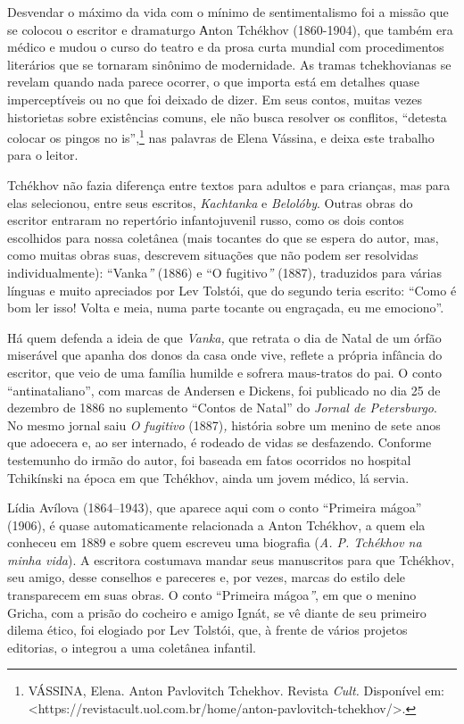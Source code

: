 Desvendar o máximo da vida com o mínimo de sentimentalismo foi a missão
que se colocou o escritor e dramaturgo Аnton Tchékhov (1860-1904), que
também era médico e mudou o curso do teatro e da prosa curta mundial com
procedimentos literários que se tornaram sinônimo de modernidade. As
tramas tchekhovianas se revelam quando nada parece ocorrer, o que
importa está em detalhes quase imperceptíveis ou no que foi deixado de
dizer. Em seus contos, muitas vezes historietas sobre existências
comuns, ele não busca resolver os conflitos, ``detesta colocar os pingos
no is'',\footnote{VÁSSINA, Elena. Anton Pavlovitch Tchekhov. Revista
  \emph{Cult.} Disponível em:
  \textless{}https://revistacult.uol.com.br/home/anton-pavlovitch-tchekhov/\textgreater{}.}
nas palavras de Elena Vássina, e deixa este trabalho para o leitor.

Tchékhov não fazia diferença entre textos para adultos e para crianças,
mas para elas selecionou, entre seus escritos, \emph{Kachtanka} e
\emph{Belolóby}. Outras obras do escritor entraram no repertório
infantojuvenil russo, como os dois contos escolhidos para nossa
coletânea (mais tocantes do que se espera do autor, mas, como muitas
obras suas, descrevem situações que não podem ser resolvidas
individualmente): ``Vanka\emph{''} (1886) e ``O fugitivo\emph{''}
(1887)\emph{,} traduzidos para várias línguas e muito apreciados por Lev
Tolstói, que do segundo teria escrito: ``Como é bom ler isso! Volta e
meia, numa parte tocante ou engraçada, eu me emociono''.

Há quem defenda a ideia de que \emph{Vanka,} que retrata o dia de Natal
de um órfão miserável que apanha dos donos da casa onde vive, reflete a
própria infância do escritor, que veio de uma família humilde e sofrera
maus-tratos do pai. O conto ``antinataliano'', com marcas de Andersen e
Dickens, foi publicado no dia 25 de dezembro de 1886 no suplemento
``Contos de Natal'' do \emph{Jornal de Petersburgo}. No mesmo jornal
saiu \emph{O fugitivo} (1887)\emph{,} história sobre um menino de sete
anos que adoecera e, ao ser internado, é rodeado de vidas se desfazendo.
Conforme testemunho do irmão do autor, foi baseada em fatos ocorridos no
hospital Tchikínski na época em que Tchékhov, ainda um jovem médico, lá
servia.

Lídia Avílova (1864--1943), que aparece aqui com o conto ``Primeira
mágoa'' (1906), é quase automaticamente relacionada a Anton Tchékhov, a
quem ela conheceu em 1889 e sobre quem escreveu uma biografia (\emph{A.
P. Tchékhov na minha vida}). A escritora costumava mandar seus
manuscritos para que Tchékhov, seu amigo, desse conselhos e pareceres e,
por vezes, marcas do estilo dele transparecem em suas obras. O conto
``Primeira mágoa\emph{''}, em que o menino Gricha, com a prisão do
cocheiro e amigo Ignát, se vê diante de seu primeiro dilema ético, foi
elogiado por Lev Tolstói, que, à frente de vários projetos editorias, o
integrou a uma coletânea infantil.

